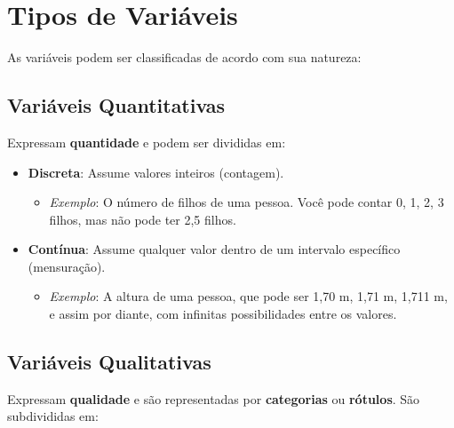 \documentclass[
]{book}
\providecommand{\tightlist}{%
  \setlength{\itemsep}{0pt}\setlength{\parskip}{0pt}}
\begin{document}
\chapter{Tipos de Variáveis}\label{tipos-de-variuxe1veis}

As variáveis podem ser classificadas de acordo com sua natureza:

\section{Variáveis Quantitativas}\label{variuxe1veis-quantitativas}

Expressam \textbf{quantidade} e podem ser divididas em:

\begin{itemize}
\tightlist
\item
  \textbf{Discreta}: Assume valores inteiros (contagem).

  \begin{itemize}
  \tightlist
  \item
    \emph{Exemplo}: O número de filhos de uma pessoa. Você pode contar 0, 1, 2, 3 filhos, mas não pode ter 2,5 filhos.
  \end{itemize}
\item
  \textbf{Contínua}: Assume qualquer valor dentro de um intervalo específico (mensuração).

  \begin{itemize}
  \tightlist
  \item
    \emph{Exemplo}: A altura de uma pessoa, que pode ser 1,70 m, 1,71 m, 1,711 m, e assim por diante, com infinitas possibilidades entre os valores.
  \end{itemize}
\end{itemize}

\section{Variáveis Qualitativas}\label{variuxe1veis-qualitativas}

Expressam \textbf{qualidade} e são representadas por \textbf{categorias} ou \textbf{rótulos}. São subdivididas em:
\end{document}

